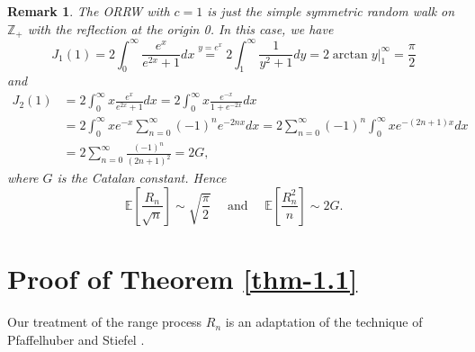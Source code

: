 \documentclass[12pt]{article}
\newtheorem{rem}[thm]{Remark}
\numberwithin{equation}{section}
\begin{document}
\begin{rem}\label{rem-1.2} The ORRW with $c=1$ is just the
  simple symmetric
 random walk on $\mathbb{Z}_{+}$  with the reflection at the origin 0. In this case, we have
\begin{equation*}
J_{1}(1) =2 \int_{0}^{\infty} \frac{e^{x}}{e^{2x}+1}dx \stackrel{y=e^{x}}{=}2 \int_{1}^{\infty}\frac{1}{y^{2}+1}dy=2 \arctan y  |_{1}^{\infty}=\frac{\pi}{2}
\end{equation*}
and
\begin{equation*}
\begin{aligned}
J_{2}(1)&=2 \int_{0}^{\infty}x\frac{e^{x}}{e^{2x}+1}dx=2 \int_{0}^{\infty} x\frac{e^{-x}}{1+e^{-2x}}dx\\
&=2 \int_{0}^{\infty}x e^{-x} \sum_{n=0}^{\infty}(-1)^{n}e^{-2nx}dx=2 \sum_{n=0}^{\infty} (-1)^{n} \int_{0}^{\infty}x e^{-(2n+1)x}dx\\
&=2\sum_{n=0}^{\infty}\frac{(-1)^{n}}{(2n+1)^{2}}=2G,
\end{aligned}
\end{equation*}
where $G$ is the Catalan constant. Hence
\begin{equation*}
\mathbb{E}\left[\frac{R_{n}}{\sqrt{n}}\right] \sim \sqrt{\frac{\pi}{2}}  \quad \text { and } \quad \mathbb{E}\left[\frac{R_{n}^{2}}{n}\right] \sim 2G.
\end{equation*}
\end{rem}



\section{Proof of Theorem \ref{thm-1.1}}\label{Proof Theorem}\setcounter{equation}{0}


Our treatment of the range process $R_n$ is an adaptation of the technique of  Pfaffelhuber and Stiefel \cite{PS}.
\end{document}

